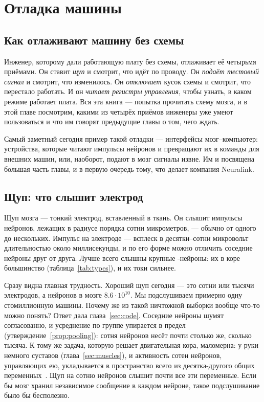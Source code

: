 \chapter{Отладка машины}
\label{sec:debugging}

\section{Как отлаживают машину без схемы}

Инженер, которому дали работающую плату без схемы, отлаживает её четырьмя приёмами. Он ставит \emph{щуп} и смотрит, что идёт по проводу. Он \emph{подаёт тестовый сигнал} и смотрит, что изменилось. Он \emph{отключает} кусок схемы и смотрит, что перестало работать. И он \emph{читает регистры управления}, чтобы узнать, в каком режиме работает плата. Вся эта книга --- попытка прочитать схему мозга, и в этой главе посмотрим, какими из четырёх приёмов инженеры уже умеют пользоваться и что им говорят предыдущие главы о том, чего ждать.

Самый заметный сегодня пример такой отладки --- интерфейсы мозг--компьютер: устройства, которые читают импульсы нейронов и превращают их в команды для внешних машин, или, наоборот, подают в мозг сигналы извне. Им и посвящена большая часть главы, и в первую очередь тому, что делает компания Neuralink.

\section{Щуп: что слышит электрод}

Щуп мозга --- тонкий электрод, вставленный в ткань. Он слышит импульсы нейронов, лежащих в радиусе порядка сотни микрометров, --- обычно от одного до нескольких. Импульс на электроде --- всплеск в десятки--сотни микровольт длительностью около миллисекунды, и по его форме можно отличить соседние нейроны друг от друга. Лучше всего слышны крупные -нейроны: их в коре большинство (таблица~\ref{tab:types}), и их токи сильнее.

Сразу видна главная трудность. Хороший щуп сегодня --- это сотни или тысячи электродов, а нейронов в мозге $8.6\cdot10^{10}$. Мы подслушиваем примерно одну стомиллионную машины. Почему же из такой ничтожной выборки вообще что-то можно понять? Ответ дала глава~\ref{sec:code}. Соседние нейроны шумят согласованно, и усреднение по группе упирается в предел (утверждение~\ref{prop:pooling}): сотня нейронов несёт почти столько же, сколько тысяча. К тому же задача, которую решает двигательная кора, маломерна: у руки немного суставов (глава~\ref{sec:muscles}), и активность сотен нейронов, управляющих ею, укладывается в пространство всего из десятка-другого общих переменных~\cite{Gallego2017}. Щуп на сотню нейронов слышит почти все эти переменные. Если бы мозг хранил независимое сообщение в каждом нейроне, такое подслушивание было бы бесполезно.

